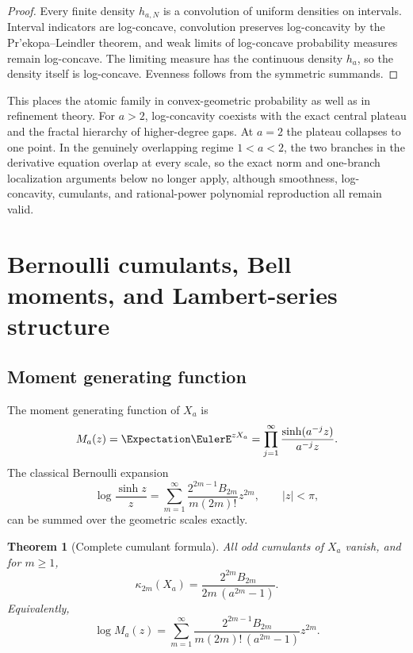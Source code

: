 \documentclass[11pt,oneside]{article}
\numberwithin{equation}{section}
\newtheorem{theorem}{Theorem}[section]
\theoremstyle{definition}
\theoremstyle{remark}
\begin{document}
\begin{proof}
Every finite density $h_{a,N}$ is a convolution of uniform densities on
intervals.  Interval indicators are log-concave, convolution preserves
log-concavity by the Pr'ekopa--Leindler theorem, and weak limits of log-concave
probability measures remain log-concave.  The limiting measure has the continuous
density $h_a$, so the density itself is log-concave.  Evenness follows from the
symmetric summands.
\end{proof}

This places the atomic family in convex-geometric probability as well as in
refinement theory.  For $a>2$, log-concavity coexists with the exact central
plateau and the fractal hierarchy of higher-degree gaps.  At $a=2$ the plateau
collapses to one point.  In the genuinely overlapping regime $1<a<2$, the two
branches in the derivative equation overlap at every scale, so the exact norm
and one-branch localization arguments below no longer apply, although smoothness,
log-concavity, cumulants, and rational-power polynomial reproduction all remain
valid.

\section{Bernoulli cumulants, Bell moments, and Lambert-series structure}\label{p6:sec:cumulants}

\subsection{Moment generating function}

The moment generating function of $X_a$ is
\begin{equation}\label{p6:eq:Ma}
 M_a(z)=\Expectation\EulerE^{zX_a}
 =\prod_{j=1}^{\infty}
 \frac{\sinh(a^{-j}z)}{a^{-j}z}.
\end{equation}
The classical Bernoulli expansion
\begin{equation}\label{p6:eq:logsinh}
 \log\frac{\sinh z}{z}
 =\sum_{m=1}^{\infty}
 \frac{2^{2m-1}B_{2m}}{m(2m)!}z^{2m},
 \qquad |z|<\pi,
\end{equation}
can be summed over the geometric scales exactly.

\begin{theorem}[Complete cumulant formula]\label{p6:thm:cumulants}
All odd cumulants of $X_a$ vanish, and for $m\ge1$,
\begin{equation}\label{p6:eq:kappa}
 \kappa_{2m}(X_a)
 =\frac{2^{2m}B_{2m}}{2m\,(a^{2m}-1)}.
\end{equation}
Equivalently,
\begin{equation}\label{p6:eq:logMa}
 \log M_a(z)=
 \sum_{m=1}^{\infty}
 \frac{2^{2m-1}B_{2m}}
 {m(2m)!\,(a^{2m}-1)}z^{2m}.
\end{equation}
\end{theorem}
\end{document}
